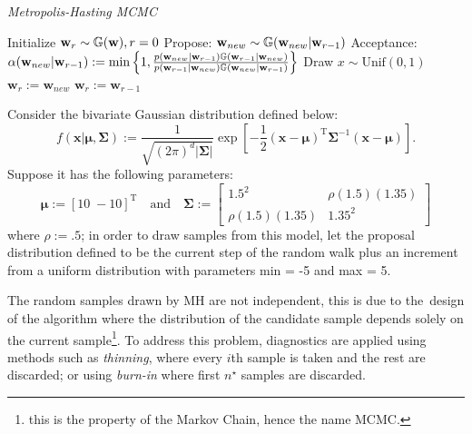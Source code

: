 \begin{algorithm}[!t]
\caption{\it Metropolis-Hasting MCMC}
\label{algo:mcmcmh}
\begin{algorithmic}[1]\vspace{.2cm}
\item Initialize $\mathbf{w}_{r}\sim\mathbb{G}(\mathbf{w}),r=0$\vspace{.2cm}
\vspace{.2cm}
\State Propose: $\mathbf{w}_{new}\sim\mathbb{G}(\mathbf{w}_{new}|\mathbf{w}_{r-1})$\vspace{.2cm}
\State Acceptance: $\alpha(\mathbf{w}_{new}|\mathbf{w}_{r-1}):=\min\left\{1,\frac{ p(\mathbf{w}_{new}|\mathbf{w}_{r-1})\mathbb{G}(\mathbf{w}_{r-1}|\mathbf{w}_{new})}{ p(\mathbf{w}_{r-1}|\mathbf{w}_{new})\mathbb{G}(\mathbf{w}_{new}|\mathbf{w}_{r-1})}\right\}$\vspace{.2cm}
\State Draw $x\sim\text{Unif}(0,1)$\vspace{.2cm}
\vspace{.2cm}
\State $\mathbf{w}_{r}:=\mathbf{w}_{new}$
\vspace{.2cm}
\Else \vspace{.2cm}
\State $\mathbf{w}_{r}:=\mathbf{w}_{r-1}$\vspace{.2cm}
\EndIf\vspace{.2cm}
\EndFor
\end{algorithmic}
\end{algorithm}
\vspace{-.3cm}
\begin{exmp}\label{exmp:mcmcmh}
Consider the bivariate Gaussian distribution defined below:
\begin{equation}
f(\mathbf{x}|\boldsymbol{\mu},\boldsymbol{\Sigma})
:=\frac{1}{\sqrt{(2\pi)^d|\boldsymbol{\Sigma}|}}\exp\left[-\frac{1}{2}(\mathbf{x} - \boldsymbol{\mu})^{\text{T}}\boldsymbol{\Sigma}^{-1}(\mathbf{x}-\boldsymbol{\mu})\right].
\end{equation}
Suppose it has the following parameters: 
\begin{equation}\nonumber
\boldsymbol{\mu}:=[10\;-10]^{\text{T}} \quad\text{and}\quad \boldsymbol{\Sigma}:=\left[\begin{array}{cc}1.5^2&\rho(1.5)(1.35)\\\rho(1.5)(1.35)&1.35^2\end{array}\right]
\end{equation}
where ${\rho := .5}$; in order to draw samples from this model, let the proposal distribution defined to be the current step of the random walk plus an increment from a uniform distribution with parameters min = -5 and max = 5.

The random samples drawn by MH are not independent, this is due to \mbox{the design} of the algorithm where the distribution of the candidate sample depends solely on the current sample\footnote{this is the property of the Markov Chain, hence the name MCMC.}. To address this problem, diagnostics are applied using methods such as \textit{thinning}, where every $i$th sample is taken and the rest are discarded; or using \textit{burn-in} where first $n^{\star}$ samples are discarded.

\end{exmp}
